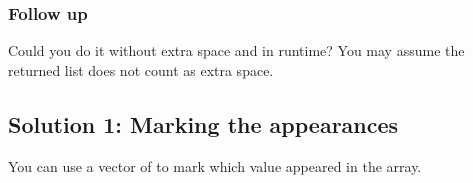 \documentclass[letterpaper,12pt,english]{book}
\begin{document}
\subsubsection{Follow up}
\label{\detokenize{Array/01_ARR_448_Find_All_Numbers_Disappeared_in_an_Array:follow-up}}
\sphinxAtStartPar
Could you do it without extra space and in  runtime? You may assume the returned list does not count as extra space.


\subsection{Solution 1: Marking the appearances}
\label{\detokenize{Array/01_ARR_448_Find_All_Numbers_Disappeared_in_an_Array:solution-1-marking-the-appearances}}
\sphinxAtStartPar
You can use a vector of  to mark which value appeared in the array.
\end{document}
